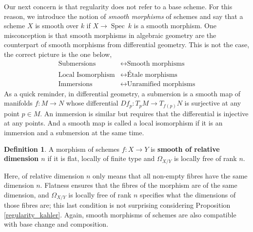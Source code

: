 \documentclass{article}
\theoremstyle{plain}
\theoremstyle{definition}
\newtheorem{definition}[theorem]{Definition}
\DeclareMathOperator{\Spec}{Spec}
\begin{document}
\noindent Our next concern is that regularity does not refer to a base scheme.
For this reason, we introduce the notion of \textit{smooth morphisms} of schemes and say that a scheme $X$ is smooth over $k$ if $X \rightarrow \Spec\:k$ is a smooth morphism. 
One misconception is that smooth morphisms in algebraic geometry are the counterpart of smooth morphisms from differential geometry.
This is not the case, the correct picture is the one below, 
\begin{equation}
\label{relation_morphism}
\begin{split}
    \text{Submersions} & \longleftrightarrow \text{Smooth morphisms}\\
    \text{Local Isomorphism} & \longleftrightarrow \text{\'Etale morphisms}\\
    \text{Immersions} & \longleftrightarrow \text{Unramified morphisms}
\end{split}
\end{equation}
\noindent As a quick reminder, in differential geometry, a submersion is a smooth map of manifolds $f:M\rightarrow N$ whose differential $Df_p: T_pM\rightarrow T_{f(p)}N$ is surjective at any point $p\in M$. 
An immersion is similar but requires that the differential is injective at any points.
And a smooth map is called a local isomorphism if it is an immersion and a submersion at the same time. 




\begin{definition}
    A morphism of schemes $f:X\rightarrow Y$ is \textbf{smooth of relative dimension $n$} if it is flat, locally of finite type and $\Omega_{X/Y}$ is locally free of rank $n$.
\end{definition}

\noindent Here, of relative dimension $n$ only means that all non-empty fibres have the same dimension $n$.
Flatness ensures that the fibres of the morphism are of the same dimension,
and $\Omega_{X/Y}$ is locally free of rank $n$ specifies what the dimensions of those fibres are; this last condition is not surprising considering Proposition \ref{regularity_kahler}. 
Again, smooth morphisms of schemes are also compatible with base change and composition.
\end{document}
